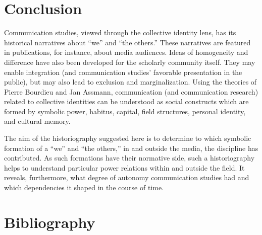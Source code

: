 \documentclass{tufte-handout}
\begin{document}
\hypertarget{conclusion}{%
\section{Conclusion}\label{conclusion}}

Communication studies, viewed through the collective identity lens, has
its historical narratives about ``we'' and ``the others.'' These
narratives are featured in publications, for instance, about media
audiences. Ideas of homogeneity and difference have also been developed
for the scholarly community itself. They may enable integration (and
communication studies' favorable presentation in the public), but may
also lead to exclusion and marginalization. Using the theories of Pierre
Bourdieu and Jan Assmann, communication (and communication research)
related to collective identities can be understood as social constructs
which are formed by symbolic power, habitus, capital, field structures,
personal identity, and cultural memory.

The aim of the historiography suggested here is to determine to which
symbolic formation of a ``we'' and ``the others,'' in and outside the
media, the discipline has contributed. As such formations have their
normative side, such a historiography helps to understand particular
power relations within and outside the field. It reveals, furthermore,
what degree of autonomy communication studies had and which dependencies
it shaped in the course of time.





\newpage

\section{Bibliography}\label{bibliography}
\end{document}
